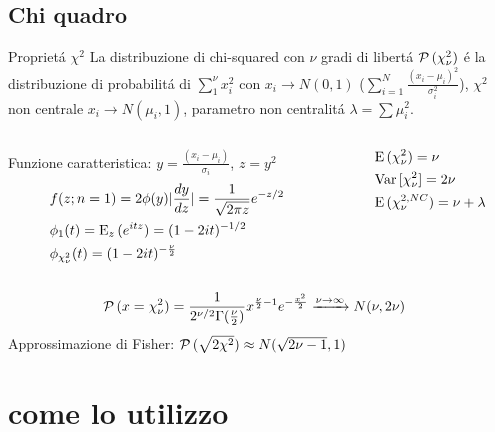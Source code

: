 \documentclass[asd-beamer.tex]{subfiles}%
\begin{document}
\subsection{Chi quadro}

\begin{frame}{Propriet\'a $\chi^2$}
La distribuzione di chi-squared con $\nu$ gradi di libert\'a $\prob{(\chi_{\nu}^2)}$ \'e la distribuzione di probabilit\'a di $\sum_1^{\nu}x_i^2$ con $x_i\to N(0,1)$ ($\sum_{i=1}^N\frac{(x_i-\mu_i)^2}{\sigma_i^2}$), $\chi^2$ non centrale $x_i\to N(\mu_i,1)$, parametro non centralit\'a $\lambda=\sum\mu_i^2$.
\begin{columns}[T]
	\begin{column}{0.7\textwidth}
Funzione caratteristica: $y=\frac{(x_i-\mu_i)}{\sigma_i}$, $z=y^2$
		\begin{align*}
		&f(z;n=1)=2\phi(y)|\TDy{z}{y}|=\frac{1}{\sqrt{2\pi z}}\exp{-z/2}\\
		&\phi_1(t)=\E_z{(\exp{itz})}=(1-2it)\expy{-1/2}\\
		&\phi_{\chi^2_{\nu}}(t)=(1-2it)\expy{-\frac{\nu}{2}}
		\end{align*}
	\end{column}
	\begin{column}{0.3\textwidth}
		\begin{align*}
		&\E{(\chi^2_{\nu})}=\nu\\
		&\var{[\chi_{\nu}^2]}=2\nu\\
		&\E{(\chi^{2,NC}_{\nu})}=\nu+\lambda
		\end{align*}
	\end{column}
\end{columns}
\begin{align*}
&\prob{(x=\chi^2_{\nu})}=\frac{1}{2\expy{\nu/2}\Gamma(\frac{\nu}{2})}x\expy{\frac{\nu}{2}-1}\exp{-\frac{x^2}{2}}\xrightarrow{\nu\to\infty}N(\nu,2\nu)
\end{align*}
Approssimazione di Fisher: $\prob{(\sqrt{2\chi^2})}\approx N(\sqrt{2\nu-1},1)$
\end{frame}

\section{come lo utilizzo}
\end{document}
